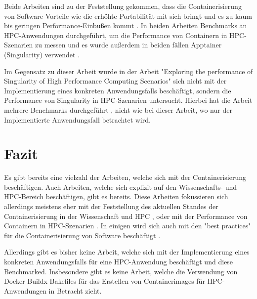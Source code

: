 Beide Arbeiten sind zu der Feststellung gekommen, dass die Containerisierung von Software Vorteile wie die erhöhte Portabilität mit sich bringt und es zu kaum bis geringen Performance-Einbußen kommt \cite[Vgl. S. 2592]{huExploringPerformanceSingularity2019}. In beiden Arbeiten Benchmarks an HPC-Anwendungen durchgeführt, um die Performance von Containern in HPC-Szenarien zu messen \cite[Vgl. S. 2587]{huExploringPerformanceSingularity2019} und es wurde außerdem in beiden fällen Apptainer (Singularity) verwendet \cite[Vgl. S. 2587]{huExploringPerformanceSingularity2019}.

Im Gegensatz zu dieser Arbeit wurde in der Arbeit "Exploring the performance of Singularity of High Performance Computing Scenarios" \cite{huExploringPerformanceSingularity2019} sich nicht mit der Implementierung eines konkreten Anwendungsfalls beschäftigt, sondern die Performance von Singularity in HPC-Szenarien untersucht. Hierbei hat die Arbeit mehrere Benchmarks durchgeführt \cite[Vgl. S. 2587]{huExploringPerformanceSingularity2019}, nicht wie bei dieser Arbeit, wo nur der Implementierte Anwendungsfall betrachtet wird.  


\section{Fazit}

Es gibt bereits eine vielzahl der Arbeiten, welche sich mit der Containerisierung beschäftigen. Auch Arbeiten, welche sich explizit auf den Wissenschafts- und HPC-Bereich beschäftigen, gibt es bereits. Diese Arbeiten fokussieren sich allerdings meistens eher mit der Feststellung des aktuellen Standes der Containerisierung in der Wissenschaft und HPC \cite{moreauContainersComputationalReproducibility2023}, oder mit der Performance von Containern in HPC-Szenarien \cite{huExploringPerformanceSingularity2019}. In einigen wird sich auch mit den "best practices" für die Containerisierung von Software beschäftigt \cite{fachrudinImplementationAnalysisContainer2025}.

Allerdings gibt es bisher keine Arbeit, welche sich mit der Implementierung eines konkreten Anwendungsfalls für eine HPC-Anwendung beschäftigt und diese Benchmarked. Insbesondere gibt es keine Arbeit, welche die Verwendung von Docker Buildx Bakefiles für das Erstellen von Containerimages für HPC-Anwendungen in Betracht zieht.



